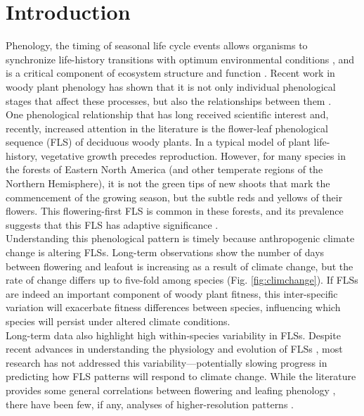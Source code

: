 \documentclass[11pt]{article}
\begin{document}
\section*{Introduction}
Phenology, the timing of seasonal life cycle events allows organisms to synchronize life-history transitions with optimum environmental conditions \citep{Forrest2010}, and is a critical component of ecosystem structure and function \citep{Cleland2007,Piao2007}. Recent work in woody plant phenology has shown that it is not only individual phenological stages that affect these processes, but also the relationships between them \citep{Ettinger2018}.\\

\noindent One phenological relationship that has long received scientific interest \citep[see][]{Robertson1895} and, recently, increased attention in the literature \citep{Savage2019, Gougherty2018} is the flower-leaf phenological sequence (FLS) of deciduous woody plants. In a typical model of plant life-history, vegetative growth precedes reproduction. However, for many species in the forests of Eastern North America (and other temperate regions of the Northern Hemisphere), it is not the green tips of new shoots that mark the commencement of the growing season, but the subtle reds and yellows of their flowers. This flowering-first FLS is common in these forests, and its prevalence suggests that this FLS has adaptive significance \citep{Rathcke_1985}.\\ 

\noindent Understanding this phenological pattern is timely because anthropogenic climate change is altering FLSs. Long-term observations show the number of days between flowering and leafout is increasing as a result of climate change, but the rate of change differs up to five-fold among species (Fig. \ref{fig:climchange}).  If FLSs are indeed an important component of woody plant fitness, this inter-specific variation will exacerbate fitness differences between species, influencing which species will persist under altered climate conditions.\\ 

\noindent Long-term data also highlight high within-species variability in FLSs. Despite recent advances in understanding the physiology and evolution of FLSs \citep{Gougherty2018,Savage2019}, most research has not addressed this variability---potentially slowing progress in predicting how FLS patterns will respond to climate change. While the literature provides some general correlations between flowering and leafing phenology \citep{Lechowicz_1995, Ettinger2018}, there have been few, if any, analyses of higher-resolution patterns \citep{Gougherty2018}. \\
\end{document}
